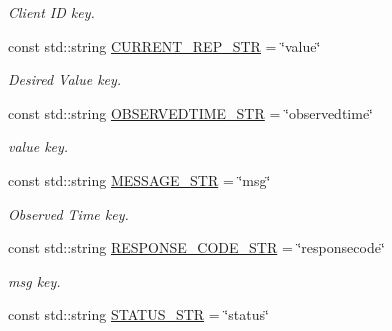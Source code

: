 \begin{DoxyCompactItemize}
\begin{DoxyCompactList}\small\item\em Client ID key. \end{DoxyCompactList}\item 
const std\+::string \hyperlink{namespacevalStrings_a6bccc104d438f858304957ffcac98b6b}{C\+U\+R\+R\+E\+N\+T\+\_\+\+R\+E\+P\+\_\+\+S\+TR} = \char`\"{}value\char`\"{}\hypertarget{namespacevalStrings_a6bccc104d438f858304957ffcac98b6b}{}\label{namespacevalStrings_a6bccc104d438f858304957ffcac98b6b}

\begin{DoxyCompactList}\small\item\em Desired Value key. \end{DoxyCompactList}\item 
const std\+::string \hyperlink{namespacevalStrings_a3cbc47bd35c5a37e59cd33d4a42163aa}{O\+B\+S\+E\+R\+V\+E\+D\+T\+I\+M\+E\+\_\+\+S\+TR} = \char`\"{}observedtime\char`\"{}\hypertarget{namespacevalStrings_a3cbc47bd35c5a37e59cd33d4a42163aa}{}\label{namespacevalStrings_a3cbc47bd35c5a37e59cd33d4a42163aa}

\begin{DoxyCompactList}\small\item\em value key. \end{DoxyCompactList}\item 
const std\+::string \hyperlink{namespacevalStrings_a4c9d54d9049ba8216bc360493daeea5c}{M\+E\+S\+S\+A\+G\+E\+\_\+\+S\+TR} = \char`\"{}msg\char`\"{}\hypertarget{namespacevalStrings_a4c9d54d9049ba8216bc360493daeea5c}{}\label{namespacevalStrings_a4c9d54d9049ba8216bc360493daeea5c}

\begin{DoxyCompactList}\small\item\em Observed Time key. \end{DoxyCompactList}\item 
const std\+::string \hyperlink{namespacevalStrings_a9e00266f78c12c6d1a16022a335147db}{R\+E\+S\+P\+O\+N\+S\+E\+\_\+\+C\+O\+D\+E\+\_\+\+S\+TR} = \char`\"{}responsecode\char`\"{}\hypertarget{namespacevalStrings_a9e00266f78c12c6d1a16022a335147db}{}\label{namespacevalStrings_a9e00266f78c12c6d1a16022a335147db}

\begin{DoxyCompactList}\small\item\em msg key. \end{DoxyCompactList}\item 
const std\+::string \hyperlink{namespacevalStrings_adde06b75e309852247b5ad7bc3c4b15b}{S\+T\+A\+T\+U\+S\+\_\+\+S\+TR} = \char`\"{}status\char`\"{}\hypertarget{namespacevalStrings_adde06b75e309852247b5ad7bc3c4b15b}{}\label{namespacevalStrings_adde06b75e309852247b5ad7bc3c4b15b}


\end{DoxyCompactItemize}
